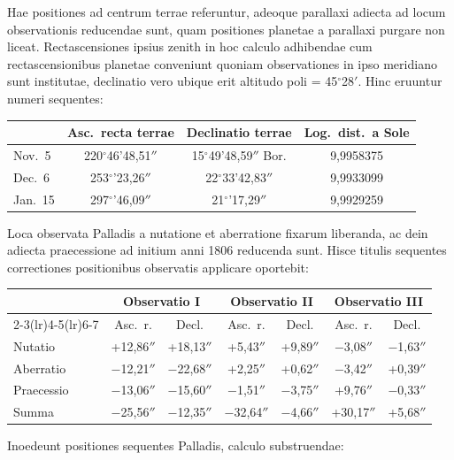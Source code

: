 \documentclass[12pt,a4paper]{article}
\begin{document}
Hae positiones ad centrum terrae referuntur, adeoque parallaxi adiecta ad locum observationis reducendae sunt, quam positiones planetae a parallaxi purgare non liceat. Rectascensiones ipsius zenith in hoc calculo adhibendae cum rectascensionibus planetae conveniunt quoniam observationes in ipso meridiano sunt institutae, declinatio vero ubique erit altitudo poli = 45$^\circ$28$'$. Hinc eruuntur numeri sequentes:

\begin{center}
\begin{tabular}{lccc}
\toprule
& Asc.~recta terrae & Declinatio terrae & Log.~dist.~a Sole\\
\midrule
Nov.\ 5 & 220$^\circ$46'48,51$''$ & 15$^\circ$49'48,59$''$ Bor. & 9,9958375\\
Dec.\ 6 & 253$^\circ$\;9'23,26$''$ & 22$^\circ$33'42,83$''$ & 9,9933099\\
Jan.\ 15 & 297$^\circ$\;2'46,09$''$ & 21$^\circ$\;8'17,29$''$ & 9,9929259\\
\bottomrule
\end{tabular}
\end{center}

Loca observata Palladis a nutatione et aberratione fixarum liberanda, ac dein adiecta praecessione ad initium anni 1806 reducenda sunt. Hisce titulis sequentes correctiones positionibus observatis applicare oportebit:

\begin{center}
\begin{tabular}{lcccccc}
\toprule
& \multicolumn{2}{c}{Observatio I} & \multicolumn{2}{c}{Observatio II} & \multicolumn{2}{c}{Observatio III}\\
\cmidrule(lr){2-3}\cmidrule(lr){4-5}\cmidrule(lr){6-7}
& Asc.~r. & Decl. & Asc.~r. & Decl. & Asc.~r. & Decl.\\
\midrule
Nutatio & +12,86$''$ & +18,13$''$ & +5,43$''$ & +9,89$''$ & $-$3,08$''$ & $-$1,63$''$\\
Aberratio & $-$12,21$''$ & $-$22,68$''$ & +2,25$''$ & +0,62$''$ & $-$3,42$''$ & +0,39$''$\\
Praecessio & $-$13,06$''$ & $-$15,60$''$ & $-$1,51$''$ & $-$3,75$''$ & +9,76$''$ & $-$0,33$''$\\
\midrule
Summa & $-$25,56$''$ & $-$12,35$''$ & $-$32,64$''$ & $-$4,66$''$ & +30,17$''$ & +5,68$''$\\
\bottomrule
\end{tabular}
\end{center}

Inoedeunt positiones sequentes Palladis, calculo substruendae:
\end{document}
